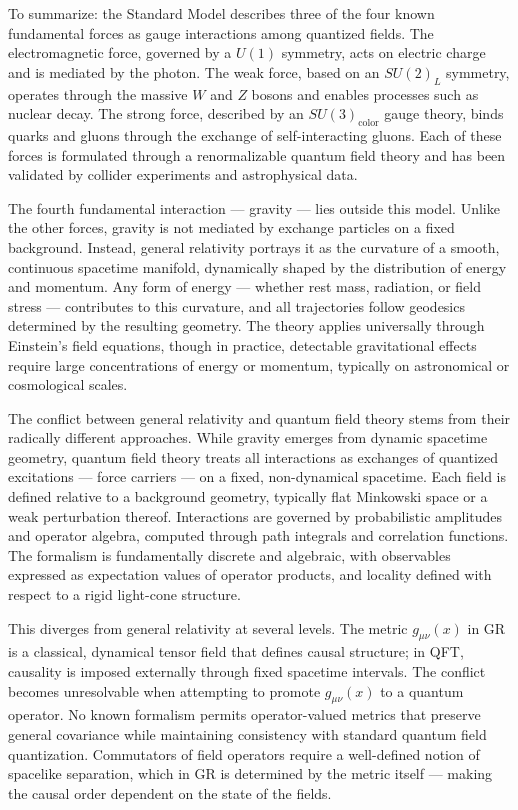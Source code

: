 To summarize: the Standard Model describes three of the four known fundamental forces as gauge interactions among quantized fields. The electromagnetic force, governed by a $U(1)$ symmetry, acts on electric charge and is mediated by the photon. The weak force, based on an $SU(2)_L$ symmetry, operates through the massive $W$ and $Z$ bosons and enables processes such as nuclear decay. The strong force, described by an $SU(3)_\text{color}$ gauge theory, binds quarks and gluons through the exchange of self-interacting gluons. Each of these forces is formulated through a renormalizable quantum field theory and has been validated by collider experiments and astrophysical data.

The fourth fundamental interaction — gravity — lies outside this model. Unlike the other forces, gravity is not mediated by exchange particles on a fixed background. Instead, general relativity portrays it as the curvature of a smooth, continuous spacetime manifold, dynamically shaped by the distribution of energy and momentum. Any form of energy — whether rest mass, radiation, or field stress — contributes to this curvature, and all trajectories follow geodesics determined by the resulting geometry. The theory applies universally through Einstein's field equations, though in practice, detectable gravitational effects require large concentrations of energy or momentum, typically on astronomical or cosmological scales.

The conflict between general relativity and quantum field theory stems from their radically different approaches. While gravity emerges from dynamic spacetime geometry, quantum field theory treats all interactions as exchanges of quantized excitations — force carriers — on a fixed, non-dynamical spacetime. Each field is defined relative to a background geometry, typically flat Minkowski space or a weak perturbation thereof. Interactions are governed by probabilistic amplitudes and operator algebra, computed through path integrals and correlation functions. The formalism is fundamentally discrete and algebraic, with observables expressed as expectation values of operator products, and locality defined with respect to a rigid light-cone structure.

This diverges from general relativity at several levels. The metric $g_{\mu\nu}(x)$ in GR is a classical, dynamical tensor field that defines causal structure; in QFT, causality is imposed externally through fixed spacetime intervals. The conflict becomes unresolvable when attempting to promote $g_{\mu\nu}(x)$ to a quantum operator. No known formalism permits operator-valued metrics that preserve general covariance while maintaining consistency with standard quantum field quantization. Commutators of field operators require a well-defined notion of spacelike separation, which in GR is determined by the metric itself — making the causal order dependent on the state of the fields.

